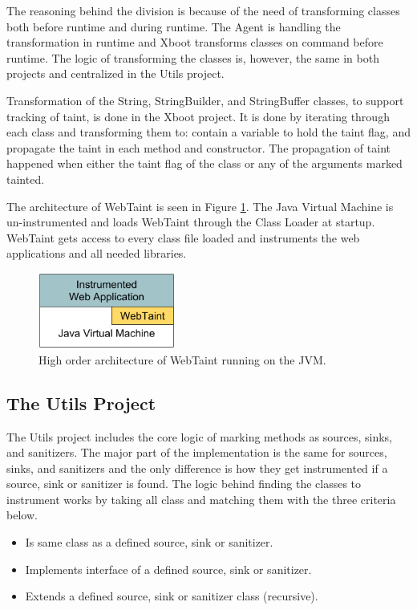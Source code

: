 The reasoning behind the division is because of the need of transforming classes both before runtime and during runtime. The Agent is handling the transformation in runtime and Xboot transforms classes on command before runtime. The logic of transforming the classes is, however, the same in both projects and centralized in the Utils project.

Transformation of the String, StringBuilder, and StringBuffer classes, to support tracking of taint, is done in the Xboot project. It is done by iterating through each class and transforming them to: contain a variable to hold the taint flag, and propagate the taint in each method and constructor. The propagation of taint happened when either the taint flag of the class or any of the arguments marked tainted.

The architecture of WebTaint is seen in Figure \ref{fig:WebTaint}. The Java Virtual Machine is un-instrumented and loads WebTaint through the Class Loader at startup. WebTaint gets access to every class file loaded and instruments the web applications and all needed libraries.

\begin{figure}[H]
    \centering
    \includegraphics[width=0.4\textwidth]{images/WebTaintArchitecture.png}
    \caption{High order architecture of WebTaint running on the JVM.}
    \label{fig:WebTaint}
\end{figure}



\subsection{The Utils Project}
The Utils project includes the core logic of marking methods as sources, sinks, and sanitizers. The major part of the implementation is the same for sources, sinks, and sanitizers and the only difference is how they get instrumented if a source, sink or sanitizer is found. The logic behind finding the classes to instrument works by taking all class and matching them with the three criteria below.

\hfill
\begin{itemize}
    \item Is same class as a defined source, sink or sanitizer.
    \item Implements interface of a defined source, sink or sanitizer.
    \item Extends a defined source, sink or sanitizer class (recursive).
\end{itemize}
\hfill

